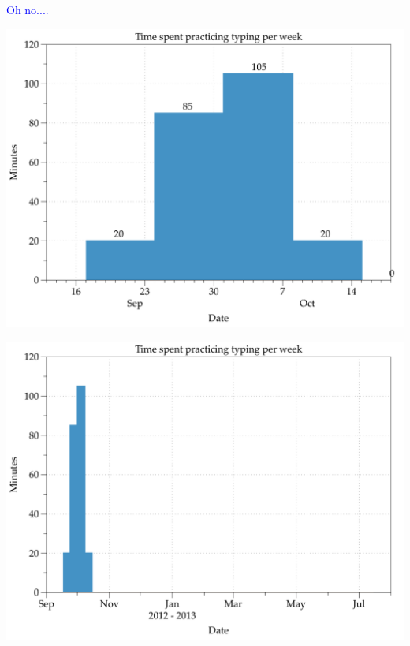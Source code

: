 \documentclass[landscape]{slides}
\begin{document}
\begin{slide}

    \textcolor{blue}{\Large{Oh no....}}

\end{slide}

\begin{slide}
    \includegraphics[width=\textwidth]{first-practice}
\end{slide}

\begin{slide}
    \includegraphics[width=\textwidth]{first-practice-long-tail}
\end{slide}
\end{document}
